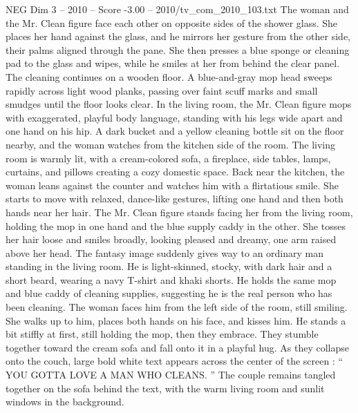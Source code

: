 \begin{textsample}{NEG Dim 3 – 2010 – Score -3.00 – 2010/tv\_com\_2010\_103.txt}
The woman and the Mr.
Clean figure face each other on opposite sides of the shower glass.
She places her hand against the glass, and he mirrors her gesture from the other side, their palms aligned through the pane.
She then presses a blue sponge or cleaning pad to the glass and wipes, while he smiles at her from behind the clear panel.
The cleaning continues on a wooden floor.
A blue-and-gray mop head sweeps rapidly across light wood planks, passing over faint scuff marks and small smudges until the floor looks clear.
In the living room, the Mr.
Clean figure mops with exaggerated, playful body language, standing with his legs wide apart and one hand on his hip.
A dark bucket and a yellow cleaning bottle sit on the floor nearby, and the woman watches from the kitchen side of the room.
The living room is warmly lit, with a cream-colored sofa, a fireplace, side tables, lamps, curtains, and pillows creating a cozy domestic space.
Back near the kitchen, the woman leans against the counter and watches him with a flirtatious smile.
She starts to move with relaxed, dance-like gestures, lifting one hand and then both hands near her hair.
The Mr.
Clean figure stands facing her from the living room, holding the mop in one hand and the blue supply caddy in the other.
She tosses her hair loose and smiles broadly, looking pleased and dreamy, one arm raised above her head.
The fantasy image suddenly gives way to an ordinary man standing in the living room.
He is light-skinned, stocky, with dark hair and a short beard, wearing a navy T-shirt and khaki shorts.
He holds the same mop and blue caddy of cleaning supplies, suggesting he is the real person who has been cleaning.
The woman faces him from the left side of the room, still smiling.
She walks up to him, places both hands on his face, and kisses him.
He stands a bit stiffly at first, still holding the mop, then they embrace.
They stumble together toward the cream sofa and fall onto it in a playful hug.
As they collapse onto the couch, large bold white text appears across the center of the screen : “ YOU GOTTA LOVE A MAN WHO CLEANS. ” The couple remains tangled together on the sofa behind the text, with the warm living room and sunlit windows in the background.

\end{textsample}
